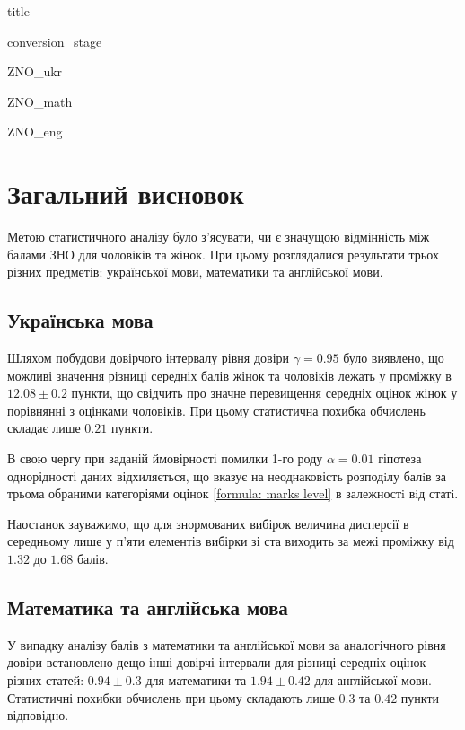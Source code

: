 \documentclass[a4paper,14pt]{extarticle} %
\numberwithin{equation}{section}
\begin{document}
{title}

\tableofcontents

\newpage
{conversion_stage}

\newpage
{ZNO_ukr}

\newpage
{ZNO_math}

\newpage
{ZNO_eng}

\newpage
\section*{Загальний висновок}

Метою статистичного аналізу було з'ясувати, чи є значущою відмінність між балами ЗНО для чоловіків 
та жінок. При цьому розглядалися результати трьох різних предметів: української мови, математики та 
англійської мови.

\subsection*{Українська мова}

Шляхом побудови довірчого інтервалу рівня довіри $\gamma=0.95$ було виявлено, що можливі значення різниці середніх балів 
жінок та чоловіків лежать у проміжку в $12.08\pm 0.2$ пункти, що свідчить про значне перевищення середніх
оцінок жінок у порівнянні з оцінками чоловіків. При цьому статистична похибка обчислень складає лише $0.21$ 
пункти. 

В свою чергу при заданій ймовірності помилки 1-го роду $\alpha=0.01$ гіпотеза однорідності даних відхиляється, 
що вказує на неоднаковість розподiлу балiв за трьома обраними категоріями оцінок \eqref{formula: marks level} 
в залежностi вiд статi.

Наостанок зауважимо, що для знормованих вибірок величина дисперсії в середньому лише у п'яти 
елементів вибірки зі ста виходить за межі проміжку від $1.32$ до $1.68$ балів.

\subsection*{Математика та англійська мова}

У випадку аналізу балів з математики та англійської мови за аналогічного рівня довіри встановлено дещо інші 
довірчі інтервали для різниці середніх оцінок різних статей: $0.94\pm 0.3$ для математики та $1.94\pm 0.42$ 
для англійської мови. Статистичні похибки обчислень при цьому складають лише $0.3$ та $0.42$ пункти відповідно. 
\end{document}
